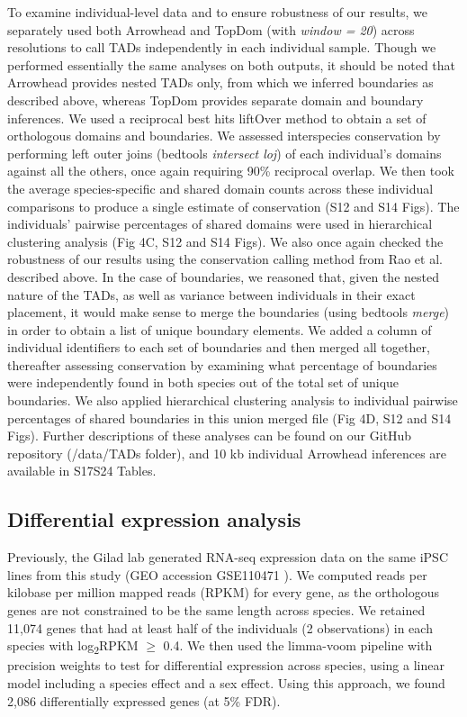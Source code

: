 To examine individual-level data and to ensure robustness of our results, we separately used both Arrowhead \cite{Durand.2016} and TopDom \cite{Shin.2016} (with \textit{window = 20}) across resolutions to call TADs independently in each individual sample. Though we performed essentially the same analyses on both outputs, it should be noted that Arrowhead provides nested TADs only, from which we inferred boundaries as described above, whereas TopDom provides separate domain and boundary inferences. We used a reciprocal best hits liftOver method \cite{Ward.2014, Kent.2002} to obtain a set of orthologous domains and boundaries. We assessed interspecies conservation by performing left outer joins (bedtools \textit{intersect {\textendash}loj}) of each individual's domains against all the others, once again requiring 90\% reciprocal overlap. We then took the average species-specific and shared domain counts across these individual comparisons to produce a single estimate of conservation (S12 and S14 Figs). The individuals' pairwise percentages of shared domains were used in hierarchical clustering analysis (Fig 4C, S12 and S14 Figs). We also once again checked the robustness of our results using the conservation calling method from Rao et al. \cite{Rao.2014} described above. In the case of boundaries, we reasoned that, given the nested nature of the TADs, as well as variance between individuals in their exact placement, it would make sense to merge the boundaries (using bedtools \textit{merge}) in order to obtain a list of unique boundary elements. We added a column of individual identifiers to each set of boundaries and then merged all together, thereafter assessing conservation by examining what percentage of boundaries were independently found in both species out of the total set of unique boundaries. We also applied hierarchical clustering analysis to individual pairwise percentages of shared boundaries in this union merged file (Fig 4D, S12 and S14 Figs). Further descriptions of these analyses can be found on our GitHub repository (/data/TADs folder), and 10 kb individual Arrowhead inferences are available in S17{\textendash}S24 Tables.

\subsection{Differential expression analysis}

Previously, the Gilad lab generated RNA-seq expression data on the same iPSC lines from this study (GEO accession GSE110471 \cite{Pavlovic.2018}). We computed reads per kilobase per million mapped reads (RPKM) for every gene, as the orthologous genes are not constrained to be the same length across species. We retained 11,074 genes that had at least half of the individuals (2 observations) in each species with log\textsubscript{2}RPKM ${\geq}$ 0.4. We then used the limma-voom pipeline with precision weights \cite{Smyth.2004, Law.2014} to test for differential expression across species, using a linear model including a species effect and a sex effect. Using this approach, we found 2,086 differentially expressed genes (at 5\% FDR).

